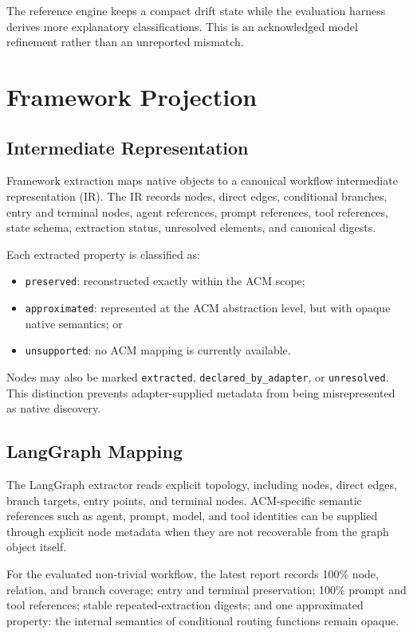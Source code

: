 \documentclass[10pt]{article}
\begin{document}
The reference engine keeps a compact drift state while the evaluation harness derives more explanatory classifications. This is an acknowledged model refinement rather than an unreported mismatch.

\section{Framework Projection}
\label{sec:projection}

\subsection{Intermediate Representation}

Framework extraction maps native objects to a canonical workflow intermediate representation (IR). The IR records nodes, direct edges, conditional branches, entry and terminal nodes, agent references, prompt references, tool references, state schema, extraction status, unresolved elements, and canonical digests.

Each extracted property is classified as:

\begin{itemize}[leftmargin=*]
  \item \texttt{preserved}: reconstructed exactly within the ACM scope;
  \item \texttt{approximated}: represented at the ACM abstraction level, but with opaque native semantics; or
  \item \texttt{unsupported}: no ACM mapping is currently available.
\end{itemize}

Nodes may also be marked \texttt{extracted}, \texttt{declared\_by\_adapter}, or \texttt{unresolved}. This distinction prevents adapter-supplied metadata from being misrepresented as native discovery.

\subsection{LangGraph Mapping}

The LangGraph extractor reads explicit topology, including nodes, direct edges, branch targets, entry points, and terminal nodes. ACM-specific semantic references such as agent, prompt, model, and tool identities can be supplied through explicit node metadata when they are not recoverable from the graph object itself.

For the evaluated non-trivial workflow, the latest report records 100\% node, relation, and branch coverage; entry and terminal preservation; 100\% prompt and tool references; stable repeated-extraction digests; and one approximated property: the internal semantics of conditional routing functions remain opaque.
\end{document}
